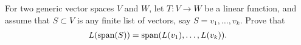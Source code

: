 \begin{question}\label{que:LOfSpan}
	\normalfont
	
	For two generic vector spaces $V$ and $W$, let $T:V\to W$ be a linear function, and assume that $S\subset V$ is any finite list of vectors, say $S=v_1,\dots, v_k$.  Prove that
	\begin{align*}
		L(\textnormal{span}(S)) = \textnormal{span}(L(v_1),\dots, L(v_k) ). 
	\end{align*}
	

\end{question}
